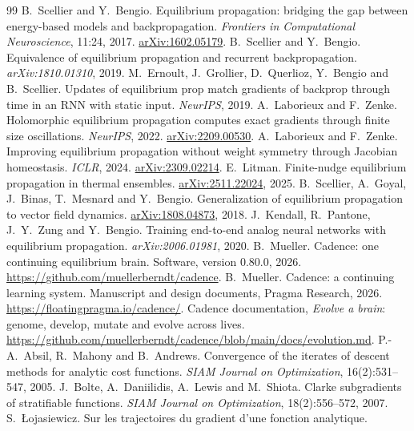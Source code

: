\documentclass[11pt]{article}
\theoremstyle{definition}
\theoremstyle{remark}
\begin{document}
\begin{thebibliography}{99}
\small
{} B.~Scellier and Y.~Bengio. Equilibrium propagation: bridging the gap between
energy-based models and backpropagation. \emph{Frontiers in Computational Neuroscience}, 11:24, 2017.
\href{https://arxiv.org/abs/1602.05179}{arXiv:1602.05179}.
 B.~Scellier and Y.~Bengio. Equivalence of equilibrium propagation and recurrent
backpropagation. \emph{arXiv:1810.01310}, 2019.
 M.~Ernoult, J.~Grollier, D.~Querlioz, Y.~Bengio and B.~Scellier. Updates of
equilibrium prop match gradients of backprop through time in an RNN with static input.
\emph{NeurIPS}, 2019.
 A.~Laborieux and F.~Zenke. Holomorphic equilibrium propagation computes exact
gradients through finite size oscillations. \emph{NeurIPS}, 2022. \href{https://arxiv.org/abs/2209.00530}{arXiv:2209.00530}.
 A.~Laborieux and F.~Zenke. Improving equilibrium propagation without weight
symmetry through Jacobian homeostasis. \emph{ICLR}, 2024. \href{https://arxiv.org/abs/2309.02214}{arXiv:2309.02214}.
 E.~Litman. Finite-nudge equilibrium propagation in thermal ensembles.
\href{https://arxiv.org/abs/2511.22024}{arXiv:2511.22024}, 2025.
 B.~Scellier, A.~Goyal, J.~Binas, T.~Mesnard and Y.~Bengio. Generalization of
equilibrium propagation to vector field dynamics. \href{https://arxiv.org/abs/1808.04873}{arXiv:1808.04873}, 2018.
 J.~Kendall, R.~Pantone, J.~Y.~Zung and Y.~Bengio. Training end-to-end analog
neural networks with equilibrium propagation. \emph{arXiv:2006.01981}, 2020.
 B.~Mueller. Cadence: one continuing equilibrium brain. Software, version 0.80.0,
2026. \url{https://github.com/muellerberndt/cadence}.
 B.~Mueller. Cadence: a continuing learning system. Manuscript and design
documents, Pragma Research, 2026. \url{https://floatingpragma.io/cadence/}.
 Cadence documentation, \emph{Evolve a brain}: genome, develop, mutate and evolve
across lives. \url{https://github.com/muellerberndt/cadence/blob/main/docs/evolution.md}.
 P.-A.~Absil, R.~Mahony and B.~Andrews. Convergence of the iterates of descent methods
for analytic cost functions. \emph{SIAM Journal on Optimization}, 16(2):531--547, 2005.
 J.~Bolte, A.~Daniilidis, A.~Lewis and M.~Shiota. Clarke subgradients of stratifiable
functions. \emph{SIAM Journal on Optimization}, 18(2):556--572, 2007.
 S.~{\L}ojasiewicz. Sur les trajectoires du gradient d'une fonction analytique.

\end{thebibliography}
\end{document}
